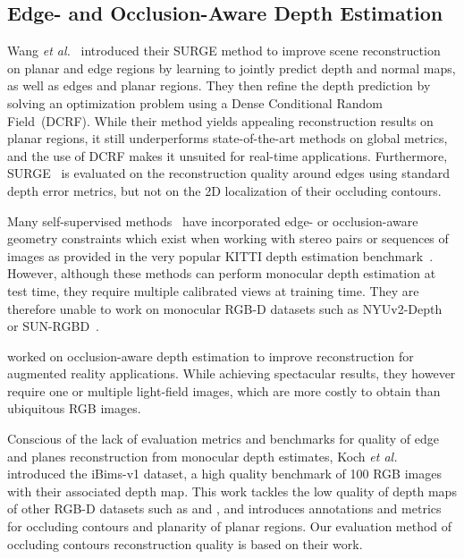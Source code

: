 \documentclass[10pt,twocolumn,letterpaper]{article}
\begin{document}
\subsection{Edge- and Occlusion-Aware Depth Estimation}

Wang \textit{et al.}~\cite{WangSurgeNIPS16} introduced their SURGE method to 
improve scene reconstruction on planar and edge regions by learning to jointly 
predict depth and normal maps, as well as edges and planar regions. They then 
refine the depth prediction by solving an optimization problem using a Dense 
Conditional Random Field~(DCRF). While their method yields appealing 
reconstruction results on planar regions, it still underperforms 
state-of-the-art methods on global metrics, and the use of DCRF makes it 
unsuited for real-time applications. Furthermore, SURGE~\cite{WangSurgeNIPS16} 
is evaluated on the reconstruction quality around edges using standard depth 
error metrics, but not on the 2D localization of their occluding contours.

Many self-supervised methods~\cite{Yang2018UnsupervisedLO,Yang2018lego, 
Yin2018UnsupervisedGeoNet, TengOcclusionAware2018, monodepth17} have 
incorporated edge- or occlusion-aware geometry constraints which exist when 
working with stereo pairs or sequences of images as provided in the very 
popular KITTI depth estimation benchmark~\cite{Geiger2013IJRR}. However, 
although these methods can perform monocular depth estimation at test time, 
they require multiple calibrated views at training time. They are 
therefore unable to work on monocular RGB-D datasets such as 
NYUv2-Depth~\cite{Nyuv2} or SUN-RGBD~\cite{Sun-rgbd}.

\cite{Wang2016LFCameras, Jiang2018DepthEW} worked on occlusion-aware depth 
estimation to improve reconstruction for augmented reality applications. While 
achieving spectacular results, they however require one or multiple light-field 
images, which are more costly to obtain than ubiquitous RGB images.

Conscious of the lack of evaluation metrics and benchmarks for quality of edge 
and planes reconstruction from monocular depth estimates, Koch \textit{et 
al.}~\cite{Koch2018EvaluationOC} introduced the iBims-v1 dataset, a high 
quality benchmark of 100 RGB images with their associated depth map. This work 
tackles the low quality of depth maps of other RGB-D datasets such as 
\cite{Sun-rgbd} and \cite{Nyuv2}, and introduces annotations and metrics for 
occluding contours and planarity of planar regions. Our evaluation method of 
occluding contours reconstruction quality is based on their work. 
\end{document}
